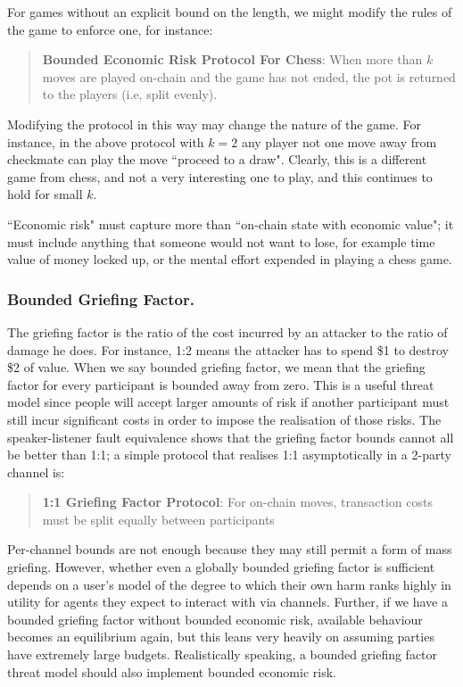 \documentclass[prb,floatfix,reprint,nofootinbib,amsmath,amssymb,epsfig,pre,floats,letterpaper,groupedaffiliation,tightenlines,allcolors=blue,11pt]{revtex4}
\theoremstyle{definition}
\theoremstyle{definition}
\theoremstyle{definition}
\begin{document}
For games without an explicit bound on the length, we might modify the rules of the game to enforce one, for instance:

\begin{quote}
\textbf{Bounded Economic Risk Protocol For Chess}: When more than $k$ moves are played on-chain and the game has not ended, the pot is returned to the players (i.e, split evenly).
\end{quote}

Modifying the protocol in this way may change the nature of the game. For instance, in the above protocol with $k=2$ any player not one move away from checkmate can play the move ``proceed to a draw". Clearly, this is a different game from chess, and not a very interesting one to play, and this continues to hold for small $k$.

``Economic risk" must capture more than ``on-chain state with economic value"; it must include anything that someone would not want to lose, for example time value of money locked up, or the mental effort expended in playing a chess game.

\subsubsection{Bounded Griefing Factor.}

The griefing factor is the ratio of the cost incurred by an attacker to the ratio of damage he does. For instance, 1:2 means the attacker has to spend \$1 to destroy \$2 of value. When we say bounded griefing factor, we mean that the griefing factor for every participant is bounded away from zero. This is a useful threat model since people will accept larger amounts of risk if another participant must still incur significant costs in order to impose the realisation of those risks. The speaker-listener fault equivalence shows that the griefing factor bounds cannot all be better than 1:1; a simple protocol that realises 1:1 asymptotically in a 2-party channel is:

\begin{quote}
\textbf{1:1 Griefing Factor Protocol}: For on-chain moves, transaction costs must be split equally between participants
\end{quote}

Per-channel bounds are not enough because they may still permit a form of mass griefing. However, whether even a globally bounded griefing factor is sufficient depends on a user's model of the degree to which their own harm ranks highly in utility for agents they expect to interact with via channels. Further, if we have a bounded griefing factor without bounded economic risk, available behaviour becomes an equilibrium again, but this leans very heavily on assuming parties have extremely large budgets. Realistically speaking, a bounded griefing factor threat model should also implement bounded economic risk.
\end{document}
